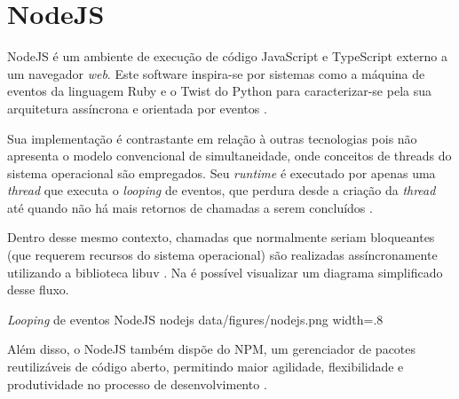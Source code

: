 \section{NodeJS}
\label{sec:nodejs}
NodeJS é um ambiente de execução de código JavaScript e TypeScript externo a um navegador \textit{web}. Este software inspira-se por sistemas como a máquina de eventos da linguagem Ruby e o Twist do Python para caracterizar-se pela sua arquitetura assíncrona e orientada por eventos \cite{Foundation2023}. 

Sua implementação é contrastante em relação à outras tecnologias pois não apresenta o modelo convencional de simultaneidade, onde conceitos de threads do sistema operacional são empregados.  Seu \textit{runtime} é executado por apenas uma \textit{thread} que executa o \textit{looping} de eventos, que perdura desde a criação da \textit{thread} até quando não há mais retornos de chamadas a serem concluídos \cite{Foundation2023}.

Dentro desse mesmo contexto, chamadas que normalmente seriam bloqueantes (que requerem recursos do sistema operacional) são realizadas assíncronamente utilizando a biblioteca libuv \cite{ClaudioWunder}. Na  é possível visualizar um diagrama simplificado desse fluxo.

\image
    {\textit{Looping} de eventos NodeJS}
    {nodejs}
    {data/figures/nodejs.png}
    {width=.8\textwidth}
    {}

Além disso, o NodeJS também dispõe do NPM, um gerenciador de pacotes reutilizáveis de código aberto, permitindo maior agilidade, flexibilidade e produtividade no processo de desenvolvimento \cite{npm2022}.